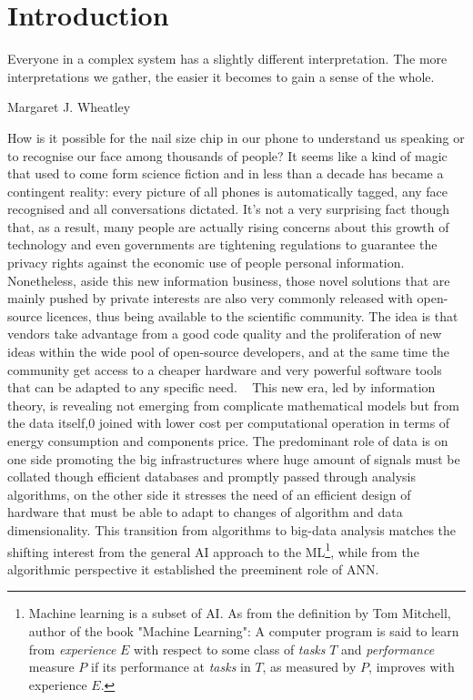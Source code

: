 

\chapter{Introduction}

\epigraph{Everyone in a complex system has a slightly different interpretation. The more interpretations we gather, the easier it becomes to gain a sense of the whole.}{Margaret J. Wheatley}


How is it possible for the nail size chip in our phone to understand us speaking or to recognise our face among thousands of people? 
It seems like a kind of magic that used to come form science fiction and in less than a decade has became a contingent reality: every picture of all phones is automatically tagged, any face recognised and all conversations dictated. 
It's not a very surprising fact though that, as a result, many people are actually rising concerns about this growth of technology and even governments are tightening regulations to guarantee the privacy rights against the economic use of people personal information.
~
Nonetheless, aside this new information business, those novel solutions that are mainly pushed by private interests are also very commonly released with open-source licences, thus being available to the scientific community. The idea is that vendors take advantage from a good code quality and the proliferation of new ideas within the wide pool of open-source developers, and at the same time the community get access to a cheaper hardware and very powerful software tools that can be adapted to any specific need.
~
This new era, led by information theory, is revealing not emerging from complicate mathematical models but from the data itself,0 joined with lower cost per computational operation in terms of energy consumption and components price. %
The predominant role of data is on one side promoting the big infrastructures where huge amount of signals must be collated though efficient databases and promptly passed through analysis algorithms, on the other side it stresses the need of an efficient design of hardware that must be able to adapt to changes of algorithm and data dimensionality. This transition from algorithms to big-data analysis matches the shifting interest from the general \ac{AI} approach to the \ac{ML}\footnote{Machine learning is a subset of \acs{AI}. As from the definition by Tom Mitchell, author of the book "Machine Learning": A computer program is said to learn from \textit{experience} $E$ with respect to some class of \textit{tasks} $T$ and \textit{performance} measure $P$ if its performance at \textit{tasks} in $T$, as measured by $P$, improves with experience $E$.}, while from the algorithmic perspective it established the preeminent role of \ac{ANN}.

